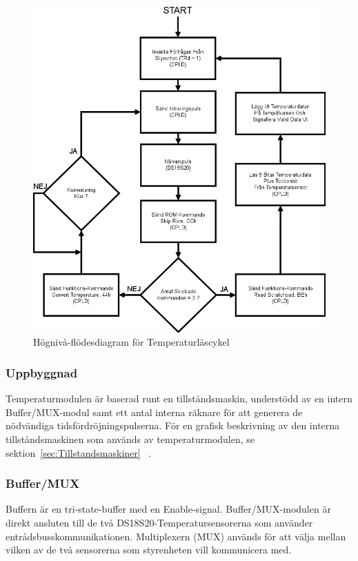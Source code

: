 \documentclass[a4paper,11pt]{article}
\begin{document}
		\begin{figure}[ht!tb]
		  \centering
		      \includegraphics[scale=0.5, angle=0]{ReadCycleFlowChart.png}
		  	\caption{Högnivå-flödesdiagram för Temperaturläscykel}
			\label{fig:RCFlowChart}
		\end{figure}

	\subsubsection{Uppbyggnad}

	Temperaturmodulen är baserad runt en tillståndsmaskin, understödd av en intern Buffer/MUX-modul samt 
	ett antal interna räknare för att generera de nödvändiga tidsfördröjningspulserna. För en grafisk beskrivning av den interna tillståndsmaskinen som används av temperaturmodulen,
	se sektion~\ref{sec:Tillstandsmaskiner} ~.

	\subsubsection{Buffer/MUX}

	Buffern är en tri-state-buffer med en Enable-signal.
	Buffer/MUX-modulen är direkt ansluten till de två DS18S20-Temperatursensorerna som använder entrådsbusskommunikationen.
	Multiplexern (MUX) används för att välja mellan vilken av de två sensorerna som styrenheten vill kommunicera med.
\end{document}
